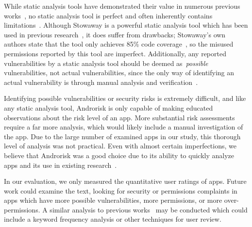\documentclass{sig-alternate-05-2015}
\newcommand{\dan}[1]{\textcolor{blue}{{\it [Dan says: #1]}}}
\begin{document}
While static analysis tools have demonstrated their value in numerous previous works~\cite{Felt:2011:APD:2046707.2046779, Pearce:2012:APS:2414456.2414498}, no static analysis tool is perfect and often inherently contains limitations~\cite{chess2004static}. Although Stowaway is a powerful static analysis tool which has been used in previous research~\cite{Pearce:2012:APS:2414456.2414498,Stevens_investigatinguser,jeon2011dr}, it does suffer from drawbacks; Stowaway's own authors state that the tool only achieves 85\% code coverage~\cite{Felt:2011:APD:2046707.2046779}, so the misused permissions reported by this tool are imperfect. Additionally, any reported vulnerabilities by a static analysis tool should be deemed as~\emph{possible} vulnerabilities, not actual vulnerabilities, since the only way of identifying an actual vulnerability is through manual analysis and verification~\cite{chess2004static}.



Identifying possible vulnerabilities or security risks is extremely difficult, and like any static analysis tool, Androrisk is only capable of making educated observations about the risk level of an app. More substantial risk assessments require a far more analysis, which would likely include a manual investigation of the app. Due to the large number of examined apps in our study, this thorough level of analysis was not practical. Even with almost certain imperfections, we believe that Androrisk was a good choice due to its ability to quickly analyze apps and its use in existing research~\cite{krutz2015dataset}.




In our evaluation, we only measured the quantitative user ratings of apps. Future work could examine the text, looking for security or permissions complaints in apps which have more possible vulnerabilities, more permissions, or more over-permissions. A similar analysis to previous works~\cite{Khalid_Mei_Examinging, Fu:2013:WPH:2487575.2488202} may be conducted which could include a keyword frequency analysis or other techniques for user review. %
\end{document}
